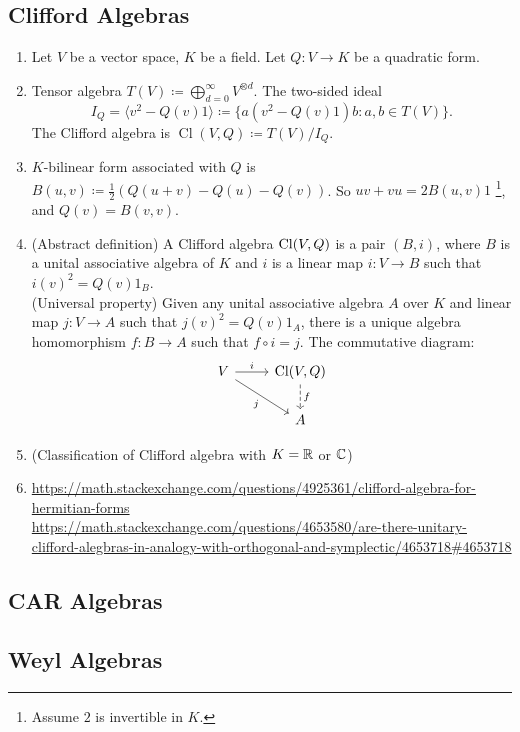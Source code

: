 \subsection{Clifford Algebras}
\begin{enumerate}
    \item Let $V$ be a vector space, $K$ be a field. Let $Q: V \to K$ be a quadratic form.
    \item Tensor algebra $T(V) \coloneqq \bigoplus_{d=0}^\infty V^{\otimes d} $. The two-sided ideal 
    \[ I_Q = \langle v^2 - Q(v)1 \rangle \coloneqq \{ a(v^2 - Q(v)1)b: a, b\in T(V) \}.\]
    The Clifford algebra is $\operatorname{Cl}(V, Q) \coloneq
     T(V) / I_Q$.
     \item $K$-bilinear form associated with $Q$ is $B(u, v) \coloneq \frac{1}{2}(Q(u+v)-Q(u)-Q(v))$. So $uv+vu=2B(u,v)1$ \footnote{Assume $2$ is invertible in $K$.}, 
     and $Q(v)=B(v,v)$.
     \item (Abstract definition) A Clifford algebra $\operatorname{Cl}(V,Q)$ is a pair $(B, i)$, where $B$ is a unital associative algebra of $K$ and $i$ is a linear map $i:V \to B$ such that $i(v)^2=Q(v) 1_B$. \\
     (Universal property) Given any unital associative algebra $A$ over $K$ and linear map $j:V\to A$ such that $j(v)^2=Q(v)1_A$, there is a unique algebra homomorphism $f:B\to A$ such that $f\circ i=j$. The commutative diagram:
     \[
    \begin{tikzcd}
    V \arrow[r, "i"] \arrow[dr, "j"'] 
      & \Cl(V,Q) \arrow[d, dashed, "f"] \\
      & A
    \end{tikzcd}
    \]
    \item (Classification of Clifford algebra with $K=\mathbb{R}$ or $\mathbb{C}$)
    \item \url{https://math.stackexchange.com/questions/4925361/clifford-algebra-for-hermitian-forms} \\
    \url{https://math.stackexchange.com/questions/4653580/are-there-unitary-clifford-alegbras-in-analogy-with-orthogonal-and-symplectic/4653718#4653718}
\end{enumerate}
\subsection{CAR Algebras}
\subsection{Weyl Algebras}
